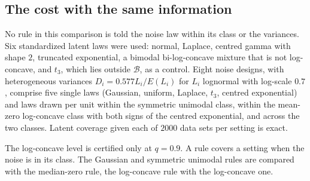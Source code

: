 \documentclass[12pt]{article}
\theoremstyle{definition}
\newcommand{\B}{\mathcal{B}}
\begin{document}
\subsection{The cost with the same information}\label{sec:cost}

No rule in this comparison is told the noise law within its class or the variances. Six standardized latent laws were used: normal, Laplace, centred gamma with shape $2$, truncated exponential, a bimodal bi-log-concave mixture that is not log-concave, and $t_3$, which lies outside $\B$, as a control. Eight noise designs, with heterogeneous variances $D_i = 0.577 L_i/E(L_i)$ for $L_i$ lognormal with log-scale $0.7$, comprise five single laws (Gaussian, uniform, Laplace, $t_3$, centred exponential) and laws drawn per unit within the symmetric unimodal class, within the mean-zero log-concave class with both signs of the centred exponential, and across the two classes. Latent coverage given each of $2000$ data sets per setting is exact.

\begin{table}[htbp]
\renewcommand{\baselinestretch}{1}
\caption{Rules with the same information at $K = 1000$: rank and width relative to the usual rank and to the rule for the same noise class without a latent shape assumption, ranges over the settings a rule covers (medians in parentheses)}
\label{tab:sameinfo}
\centering
\fontsize{9}{11pt}\selectfont
{}
\par\smallskip
\parbox{\textwidth}{\fontsize{8}{10pt}\selectfont The log-concave level is certified only at $q = 0.9$. A rule covers a setting when the noise is in its class. The Gaussian and symmetric unimodal rules are compared with the median-zero rule, the log-concave rule with the log-concave one.}
\end{table}
\end{document}
